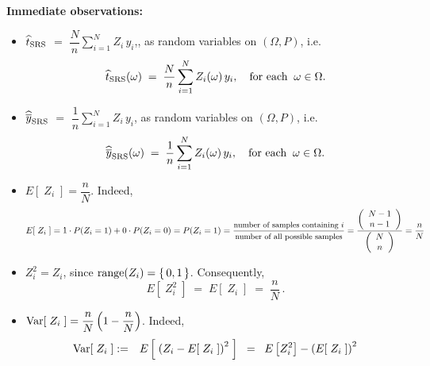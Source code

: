 \documentclass{article}
\begin{document}
\noindent\textbf{Immediate observations:}
\begin{itemize}
\item  $\widehat{t}_{\textnormal{SRS}}$ $=$ $\dfrac{N}{n}\sum^{N}_{i=1} Z_{i}\,y_{i}$,, as random variables on $(\Omega,P)$, i.e.
          \begin{equation*}
              \widehat{t}_{\textnormal{SRS}}(\omega) \; = \; \dfrac{N}{n}\sum_{i=1}^{N} Z_{i}(\omega)\,y_{i},
               \quad\textnormal{for each} \;\; \omega \in \Omega.
          \end{equation*}
\item  $\widehat{\overline{y}}_{\textnormal{SRS}}$ $=$ $\dfrac{1}{n}\sum_{i=1}^{N} Z_{i}\,y_{i}$, as random variables on $(\Omega,P)$, i.e.
          \begin{equation*}
              \widehat{\overline{y}}_{\textnormal{SRS}}(\omega) \; = \; \dfrac{1}{n}\sum_{i=1}^{N} Z_{i}(\omega)\,y_{i},
               \quad\textnormal{for each} \;\; \omega \in \Omega.
          \end{equation*}
\item  $E[\;Z_{i}\;] = \dfrac{n}{N}$.  \; Indeed,
          \begin{equation*}
              E[\;Z_{i}\;] = 1 \cdot P(Z_{i}=1) + 0 \cdot P(Z_{i}=0) = P(Z_{i}=1)
              = \dfrac{\textnormal{\small number of samples containing $i$}}{\textnormal{\small number of all possible samples}}
              = \dfrac{\left(\begin{array}{c} N-1 \\ n-1 \end{array}\right)}{\left(\begin{array}{c} N \\ n \end{array}\right)}
              = \dfrac{n}{N}
          \end{equation*}
\item  $Z_{i}^{2} = Z_{i}$, since $\textnormal{range}(Z_{i}) = \{\,0,1\,\}$.  Consequently,
          \begin{equation*}
              E[\;Z_{i}^{2}\;] \; = \; E[\;Z_{i}\;] \; = \; \dfrac{n}{N}\,.
          \end{equation*}
\item  $\textnormal{Var}[\;Z_{i}\;] = \dfrac{n}{N}\left(1 - \dfrac{n}{N}\right)$. \; Indeed,
          \begin{eqnarray*}
              \Var[\;Z_{i}\;] & := & E\left[\;\left(Z_{i} - E[\;Z_{i}\;]\right)^{2}\;\right]
                                                      \;\; = \;\; E\left[Z_{i}^{2}\right] - \left(E[\;Z_{i}\;]\right)^{2} \\

\end{eqnarray*}
\end{itemize}
\end{document}
